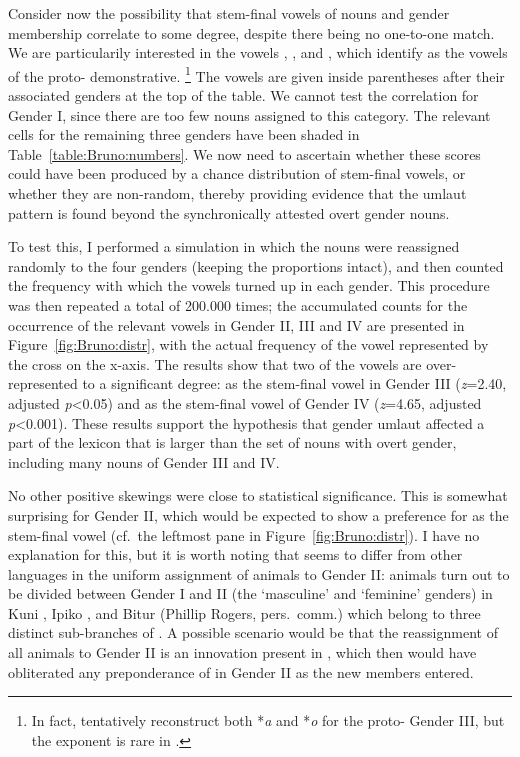 \documentclass[output=collectionpaper]{langsci/langscibook}
\begin{document}
Consider now the possibility that stem-final vowels of nouns and gender membership correlate to some degree, despite there being no one-to-one match. We are particularily interested in the vowels , ,  and , which \textcite{Usher2015} identify as the vowels of the proto- demonstrative.%
\footnote{In fact, \textcite[119]{Usher2015} tentatively reconstruct both *\emph{a} and *\emph{o} for the proto- Gender III, but the exponent  is rare in .} %
The vowels are given inside parentheses after their associated genders at the top of the table.
We cannot test the correlation for Gender I, since there are too few nouns assigned to this category. The relevant cells for the remaining three genders have been shaded in Table~\ref{table:Bruno:numbers}. We now need to ascertain whether these scores could have been produced by a chance distribution of stem-final vowels, or whether they are non-random, thereby providing evidence that the umlaut pattern is found beyond the synchronically attested overt gender nouns.

To test this, I performed a simulation in which the nouns were reassigned randomly to the four genders (keeping the proportions intact), and then counted the frequency with which the vowels turned up in each gender. This procedure was then repeated a total of 200.000 times; the accumulated counts for the occurrence of the relevant vowels in Gender II, III and IV are presented in Figure~\ref{fig:Bruno:distr}, with the actual frequency of the vowel represented by the cross on the x-axis. The results show that two of the vowels are over-represented to a significant degree:  as the stem-final vowel in Gender III (\emph{z}=2.40, adjusted \emph{p}<0.05) and  as the stem-final vowel of Gender IV (\emph{z}=4.65, adjusted \emph{p}<0.001). These results support the hypothesis that gender umlaut  affected a part of the lexicon that is larger than the set of nouns with overt gender, including many nouns of Gender III and IV.

No other positive skewings were close to statistical significance. This is somewhat surprising for Gender II, which would be expected to show a preference for  as the stem-final vowel (cf.\ the leftmost pane in Figure~\ref{fig:Bruno:distr}). I have no explanation for this, but it is worth noting that  seems to differ from other  languages in the uniform assignment of animals to Gender II: animals turn out to be divided between Gender I and II (the `masculine' and `feminine' genders) in Kuni \parencite[9]{Edwards-Fumey2007}, Ipiko \citep[117, examples 16--17]{Usher2015}, and Bitur (Phillip Rogers, pers.\ comm.\@) which belong to three distinct sub-branches of . A possible scenario would be that the reassignment of all animals to Gender II is an innovation present in , which then would have obliterated any preponderance of  in Gender II as the new members entered.
\end{document}
